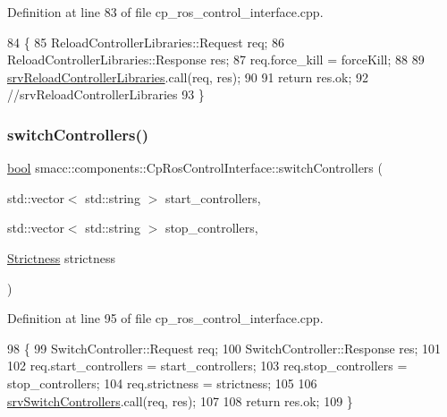 Definition at line 83 of file cp\+\_\+ros\+\_\+control\+\_\+interface.\+cpp.


\begin{DoxyCode}
84 \{
85     ReloadControllerLibraries::Request req;
86     ReloadControllerLibraries::Response res;
87     req.force\_kill = forceKill;
88 
89     \hyperlink{classsmacc_1_1components_1_1CpRosControlInterface_afdfece75d6aa438fae728e72add50e16}{srvReloadControllerLibraries}.call(req, res);
90 
91     \textcolor{keywordflow}{return} res.ok;
92     \textcolor{comment}{//srvReloadControllerLibraries}
93 \}
\end{DoxyCode}
\mbox{\label{classsmacc_1_1components_1_1CpRosControlInterface_a1cdb86924bbc0ab5f932d5504a943cbb}} 
\subsubsection{\texorpdfstring{switch\+Controllers()}{switchControllers()}}
{\footnotesize\ttfamily \hyperlink{classbool}{bool} smacc\+::components\+::\+Cp\+Ros\+Control\+Interface\+::switch\+Controllers (\begin{DoxyParamCaption}\item[{std\+::vector$<$ std\+::string $>$}]{start\+\_\+controllers,  }\item[{std\+::vector$<$ std\+::string $>$}]{stop\+\_\+controllers,  }\item[{\hyperlink{namespacesmacc_1_1components_a18117d6a71feb2471fb4e07f47674e4c}{Strictness}}]{strictness }\end{DoxyParamCaption})}



Definition at line 95 of file cp\+\_\+ros\+\_\+control\+\_\+interface.\+cpp.


\begin{DoxyCode}
98 \{
99     SwitchController::Request req;
100     SwitchController::Response res;
101 
102     req.start\_controllers = start\_controllers;
103     req.stop\_controllers = stop\_controllers;
104     req.strictness = strictness;
105 
106     \hyperlink{classsmacc_1_1components_1_1CpRosControlInterface_a78e45e68567c23ca5c19df0de257c20f}{srvSwitchControllers}.call(req, res);
107 
108     \textcolor{keywordflow}{return} res.ok;
109 \}
\end{DoxyCode}
\mbox{\label{classsmacc_1_1components_1_1CpRosControlInterface_a0c65acff40f36a15c67fab7c77ca23c8}} 
